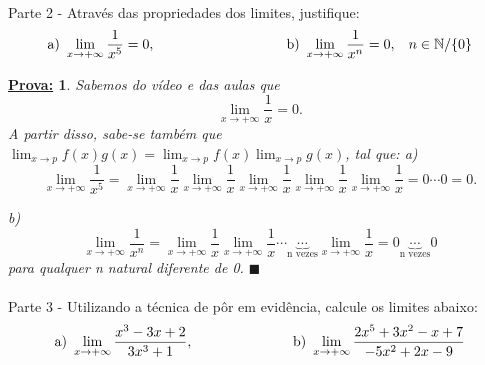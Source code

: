 \documentclass{article}
\newtheorem*{proof*}{\underline{Prova:}}
\renewcommand\qedsymbol{$\blacksquare$}
\begin{document}
\paragraph{}Parte 2 - Atrav\'es das propriedades dos limites, justifique:
$$
	\text{a) }\lim_{x\to+\infty}\frac{1}{x^5} = 0,\hspace{3.3cm}
	\text{b) }\lim_{x\to+\infty}\frac{1}{x^n} = 0,\hspace{.3cm} n\in\mathbb{N}\slash\{0\}
$$
\begin{proof*}
	Sabemos do v\'ideo e das aulas que
	$$
		\lim_{x\to+\infty}\frac{1}{x} = 0.
	$$
	A partir disso, sabe-se tamb\'em que $\lim_{x\to{p}}f(x)g(x) = \lim_{x\to{p}}f(x)\lim_{x\to{p}}g(x)$, tal que:
	a)
	$$
		\lim_{x\to+\infty}\frac{1}{x^5} = \lim_{x\to+\infty}\frac{1}{x}\lim_{x\to+\infty}\frac{1}{x}\lim_{x\to+\infty}\frac{1}{x}\lim_{x\to+\infty}\frac{1}{x}\lim_{x\to+\infty}\frac{1}{x} = 0\cdots0 = 0.
	$$

	b)
	$$
		\lim_{x\to+\infty}\frac{1}{x^n} = \lim_{x\to+\infty}\frac{1}{x}\lim_{x\to+\infty}\frac{1}{x}\cdots\underbrace{\cdots}_{\text{n vezes}}\lim_{x\to+\infty}\frac{1}{x} = 0\underbrace{\cdots}_{\text{n vezes}}0
	$$
	para qualquer n natural diferente de 0.
	\qedsymbol
\end{proof*}

\paragraph{}Parte 3 - Utilizando a t\'ecnica de p\^or em evid\^encia, calcule os limites abaixo:
$$
	\text{a) }\lim_{x\to+\infty}\frac{x^3 - 3x + 2}{3x^3 + 1},\hspace{2.5cm}
	\text{b) }\lim_{x\to+\infty}\frac{2x^5 + 3x^2 - x + 7}{-5x^2 + 2x - 9}
$$
\end{document}
